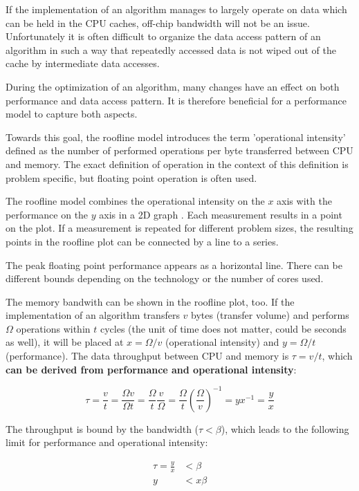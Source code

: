 \documentclass[a4paper,12pt]{article}
\newlength{\imgwidth}
\newlength{\imgleftoverhang}
\newcommand{\graphNoVskip}[1]
{
	\settowidth{\imgwidth}{\texttt{[image: graphs/\#1.pdf]}}
	\setlength{\imgleftoverhang}{0.1\textwidth}
	\setlength{\imgwidth}{1.205\textwidth}
	\hfuzz50pt
	\noindent\hskip-\imgleftoverhang
	\hskip-0.25in\texttt{[image: graphs/\#1.pdf]}
	\hfuzz0.1pt
}
\newcommand{\graphFloat}[2]
{
\begin{figure}[htbp]
\graphNoVskip{#1}
\vskip-0.5cm
\caption{#2}
\label{#1}
\end{figure}
}
\begin{document}
If the implementation of an algorithm manages to largely operate on data which
can be held in the CPU caches, off-chip bandwidth will not be an issue. 
Unfortunately it is often difficult to organize the data access
pattern of an algorithm in such a way that repeatedly accessed data is not
wiped out of the cache by intermediate data accesses.

During the optimization of an algorithm, many changes have an effect on both
performance and data access pattern. It is therefore beneficial for a
performance model to capture both aspects.

Towards this goal, the roofline model introduces the term 'operational
intensity' defined as the number of performed operations per byte transferred
between CPU and memory. The exact definition of operation in the context of
this definition is problem specific, but floating point operation is often used.


The roofline model combines the operational intensity on the $x$ axis with the
performance on the $y$ axis in a 2D graph . Each
measurement results in a point on the plot. If a measurement is repeated
for different problem sizes, the resulting points in the roofline plot
can be connected by a line to a series.

The peak floating point performance appears as a horizontal line. There can be
different bounds depending on the technology or the number of cores used. 

The memory bandwith can be shown in the roofline plot, too. If the
implementation of an algorithm transfers $v$ bytes (transfer volume) and
performs $\Omega$ operations within $t$ cycles (the unit of time does not
matter, could be seconds as well), it will be placed at $x=\Omega/v$
(operational intensity) and $y=\Omega/t$ (performance). The data throughput
between CPU and memory is $\tau=v/t$, which {\bf can be derived from performance
and operational intensity}:

$$
\tau=\frac{v}{t}
=\frac{\Omega v}{\Omega t}
=\frac{\Omega}{t}\frac{v}{\Omega}
=\frac{\Omega}{t}(\frac{\Omega}{v})^{-1}
=yx^{-1}
=\frac{y}{x}
$$

The throughput is bound by the bandwidth ($\tau<\beta$), which leads to the
following limit for performance and operational intensity:

\begin{align*}
\tau=\frac{y}{x}&<\beta\\
y&<x\beta 
\end{align*}
\end{document}
